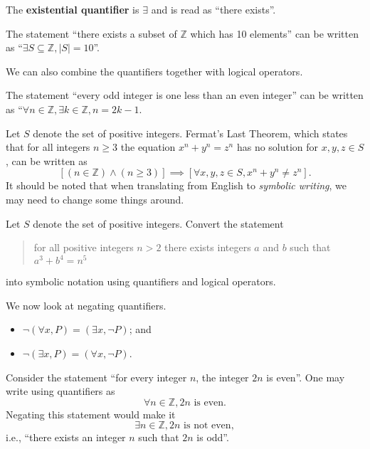 \begin{definition}
    The \textbf{existential quantifier} is $\exists$ and is  read as ``there exists''.
\end{definition}
\begin{example}
    The statement ``there exists a subset of $\mathbb{Z}$ which has 10 elements'' can be written as ``$\exists S \subseteq \mathbb{Z}, |S| = 10$''.
\end{example}

We can also combine the quantifiers together with logical operators.
\begin{example}
    The statement ``every odd integer is one less than an even integer'' can be written as ``$\forall n \in \mathbb{Z}, \exists k \in \mathbb{Z}, n = 2k - 1$.
\end{example}
\begin{example}
    Let $S$ denote the set of positive integers. Fermat's Last Theorem, which states that for all integers $n\geq 3$ the equation $x^n + y^n = z^n$ has no solution for $x, y, z \in S$, can be written as
    \[
        \left[(n \in \mathbb{Z}) \land (n \geq 3)\right] \implies \left[\forall x, y, z \in S, x^n + y^n \neq z^n\right].
    \]
    It should be noted that when translating from English to \textit{symbolic writing}, we may need to change some things around.
\end{example}

\begin{exercise}
    Let $S$ denote the set of positive integers. Convert the statement
    \begin{quote}
        for all positive integers $n > 2$ there exists integers $a$ and $b$ such that $a^3 + b^4 = n^5$
    \end{quote}
    into symbolic notation using quantifiers and logical operators.
\end{exercise}

We now look at negating quantifiers.
\begin{itemize}
    \item $\lnot(\forall x, P) = (\exists x, \lnot P)$; and
    \item $\lnot(\exists x, P) = (\forall x, \lnot P)$.
\end{itemize}
\begin{example}
    Consider the statement ``for every integer $n$, the integer $2n$ is even''. One may write using quantifiers as
    \[
        \forall n \in\mathbb{Z}, 2n \text{ is even}.
    \]
    Negating this statement would make it
    \[
        \exists n \in \mathbb{Z}, 2n \text{ is not even},
    \]
    i.e., ``there exists an integer $n$ such that $2n$ is odd''.
\end{example}


